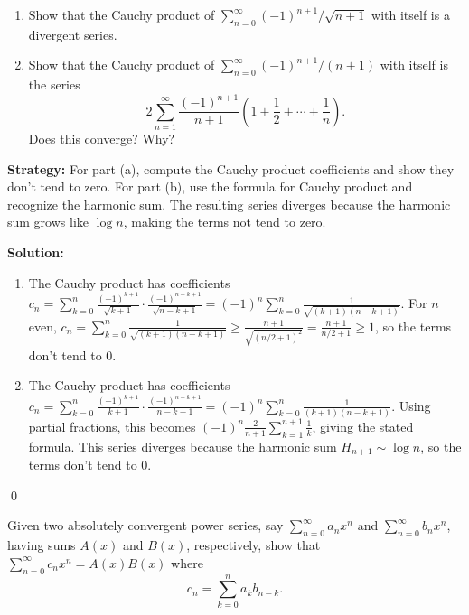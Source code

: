 \begin{problembox}
\begin{problemstatement}
\begin{enumerate}[label=\alph*)]
\item Show that the Cauchy product of \(\sum_{n=0}^{\infty} (-1)^{n+1}/\sqrt{n + 1}\) with itself is a divergent series.
\item Show that the Cauchy product of \(\sum_{n=0}^{\infty} (-1)^{n+1}/(n + 1)\) with itself is the series
\[2 \sum_{n=1}^{\infty} \frac{(-1)^{n+1}}{n + 1} \left( 1 + \frac{1}{2} + \cdots + \frac{1}{n} \right).\]
Does this converge? Why?
\end{enumerate}
\end{problemstatement}
\end{problembox}

\noindent\textbf{Strategy:} For part (a), compute the Cauchy product coefficients and show they don't tend to zero. For part (b), use the formula for Cauchy product and recognize the harmonic sum. The resulting series diverges because the harmonic sum grows like \(\log n\), making the terms not tend to zero.

\bigskip\noindent\textbf{Solution:}
\begin{enumerate}[label=(\alph*)]
\item The Cauchy product has coefficients \(c_n = \sum_{k=0}^n \frac{(-1)^{k+1}}{\sqrt{k+1}} \cdot \frac{(-1)^{n-k+1}}{\sqrt{n-k+1}} = (-1)^n \sum_{k=0}^n \frac{1}{\sqrt{(k+1)(n-k+1)}}\). For \(n\) even, \(c_n = \sum_{k=0}^n \frac{1}{\sqrt{(k+1)(n-k+1)}} \geq \frac{n+1}{\sqrt{(n/2+1)^2}} = \frac{n+1}{n/2+1} \geq 1\), so the terms don't tend to 0.

\item The Cauchy product has coefficients \(c_n = \sum_{k=0}^n \frac{(-1)^{k+1}}{k+1} \cdot \frac{(-1)^{n-k+1}}{n-k+1} = (-1)^n \sum_{k=0}^n \frac{1}{(k+1)(n-k+1)}\). Using partial fractions, this becomes \((-1)^n \frac{2}{n+1} \sum_{k=1}^{n+1} \frac{1}{k}\), giving the stated formula. This series diverges because the harmonic sum \(H_{n+1} \sim \log n\), so the terms don't tend to 0.
\end{enumerate}\qed



\begin{problembox}
\begin{problemstatement}
Given two absolutely convergent power series, say \(\sum_{n=0}^{\infty} a_n x^n\) and \(\sum_{n=0}^{\infty} b_n x^n\), having sums \(A(x)\) and \(B(x)\), respectively, show that \(\sum_{n=0}^{\infty} c_n x^n = A(x) B(x)\) where
\[c_n = \sum_{k=0}^{n} a_k b_{n-k}.\]
\end{problemstatement}
\end{problembox}

